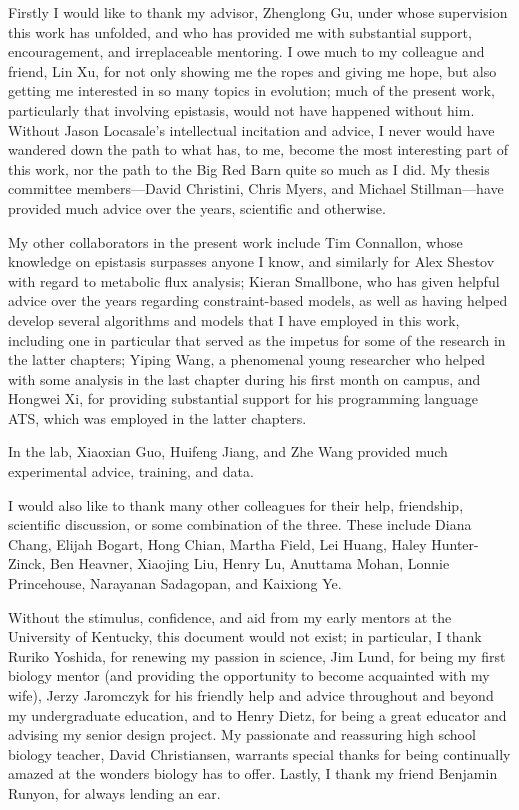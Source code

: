 \documentclass[phd,tocprelim]{cornell}
\begin{document}
\begin{acknowledgements}
Firstly I would like to thank my advisor,  Zhenglong Gu, under
whose supervision this work has unfolded, and who has provided me with
substantial support, encouragement, and irreplaceable mentoring. I owe
much to my colleague and friend, Lin Xu, for not only showing me
the ropes and giving me hope, but also getting me interested in so
many topics in evolution; much of the present work, particularly that
involving epistasis, would not have happened without him. Without
Jason Locasale's intellectual incitation and advice, I never would
have wandered down the path to what has, to me, become the most
interesting part of this work, nor the path to the Big Red Barn quite
so much as I did. My thesis committee members---David Christini,
Chris Myers, and Michael Stillman---have provided much advice
over the years, scientific and otherwise.

My other collaborators in the present work include Tim Connallon,
whose knowledge on epistasis surpasses anyone I know, and similarly
for Alex Shestov with regard to metabolic flux analysis;
Kieran Smallbone, who has given helpful advice over the years 
regarding constraint-based models, as well as having helped develop several  
algorithms and models that I have employed in this work, including one in 
particular that served as the impetus for some of the research in the latter 
chapters; Yiping Wang, a phenomenal young researcher who helped
with some analysis in the last chapter during his first month on
campus, and Hongwei Xi, for providing substantial support for his
programming language ATS, which was employed in the latter chapters.

In the lab, Xiaoxian Guo, Huifeng Jiang, and Zhe Wang
provided much experimental advice, training, and data.

I would also like to thank many other colleagues for their help,
friendship, scientific discussion, or some combination of
the three. These include Diana Chang, Elijah Bogart, 
Hong Chian, Martha Field, Lei Huang,
Haley Hunter-Zinck, Ben Heavner, Xiaojing Liu, Henry Lu, Anuttama Mohan,
Lonnie Princehouse, Narayanan Sadagopan, and Kaixiong Ye.

Without the stimulus, confidence, and aid from my early mentors at the
University of Kentucky, this document would not exist; in particular,
I thank Ruriko Yoshida, for renewing my passion in science,
Jim Lund, for being my first biology mentor (and providing the
opportunity to become acquainted with my wife), Jerzy Jaromczyk
for his friendly help and advice throughout and beyond my
undergraduate education, and to Henry Dietz, for being a great
educator and advising my senior design project.  My passionate and
reassuring high school biology teacher, David Christiansen,
warrants special thanks for being continually amazed at the wonders
biology has to offer. Lastly, I thank my friend Benjamin Runyon,
for always lending an ear.
\end{acknowledgements}
\end{document}
